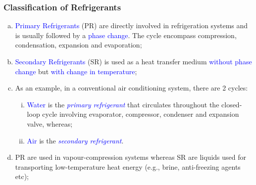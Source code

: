\documentclass[10pt,compress]{beamer}
\begin{document}
\begin{frame}
 \frametitle{Classification of Refrigerants}
 \begin{enumerate}[(a)]
   \item <1-> \textcolor{blue}{Primary Refrigerants} (PR) are directly involved in refrigeration systems and is usually followed by a \textcolor{blue}{phase change}. The cycle encompass compression, condensation, expansion and evaporation;
   \item <2-> \textcolor{blue}{Secondary Refrigerants} (SR) is used as a heat transfer medium  \textcolor{blue}{without phase change} but \textcolor{blue}{with change in temperature};
   \item <3-> As an example, in a conventional air conditioning system, there are 2 cycles: 
    \begin{enumerate}[(i)]
     \item <4-> \textcolor{blue}{Water} is the \textcolor{blue}{{\it primary refrigerant}} that circulates throughout the closed-loop cycle involving evaporator, compressor, condenser and expansion valve, whereas;
     \item <5-> \textcolor{blue}{Air} is the \textcolor{blue}{{\it secondary refrigerant}}.
    \end{enumerate}
    \item <6-> PR are used in vapour-compression systems whereas SR are liquids used for transporting low-temperature heat energy (e.g., brine, anti-freezing agents etc);
  \end{enumerate}
\end{frame}
\end{document}
